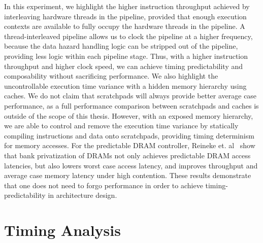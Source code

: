 In this experiment, we highlight the higher instruction throughput achieved by interleaving hardware threads in the pipeline, provided that enough execution contexts are available to fully occupy the hardware threads in the pipeline.  
A thread-interleaved pipeline allows us to clock the pipeline at a higher frequency, because the data hazard handling logic can be stripped out of the pipeline, providing less logic within each pipeline stage.
Thus, with a higher instruction throughput and higher clock speed, we can achieve timing predictability and composability without sacrificing performance. 
We also highlight the uncontrollable execution time variance with a hidden memory hierarchy using caches.
We do not claim that scratchpads will always provide better average case performance, as a full performance comparison between scratchpads and caches is outside of the scope of this thesis. 
However, with an exposed memory hierarchy, we are able to control and remove the execution time variance by statically compiling instructions and data onto scratchpads, providing timing determinism for memory accesses.
For the predictable DRAM controller, Reineke et. al~\cite{ReinekeLiuPatelKimLee11_PRETDRAMControllerBankPrivatizationForPredictability} show that bank privatization of DRAMs not only achieves predictable DRAM access latencies, but also lowers worst case access latency, and improves throughput and average case memory latency under high contention. 
These results demonstrate that one does not need to forgo performance in order to achieve timing-predictability in architecture design.

\section{Timing Analysis}
\label{sec:wcet}

